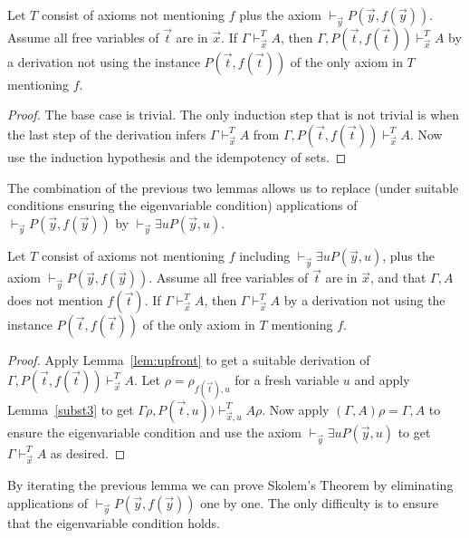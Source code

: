 \documentclass[10pt,a4paper]{article}
\begin{document}
\begin{lemma}\label{lem:upfront}
Let $T$ consist of axioms not
mentioning $f$ plus the axiom $\vdash_{\vec{y}} P(\vec{y},f(\vec{y}))$.
Assume all free variables of $\vec{t}$ are in $\vec{x}$. 
If $\Gamma\vdash_{\vec{x}}^T A$, 
then $\Gamma,P(\vec{t},f(\vec{t}))\vdash_{\vec{x}}^T A$
by a derivation not using the instance $P(\vec{t},f(\vec{t}))$
of the only axiom in $T$ mentioning $f$.
\end{lemma}

\begin{proof}
The base case is trivial.
The only induction step that is not trivial is when the last step
of the derivation infers $\Gamma\vdash_{\vec{x}}^T A$
from $\Gamma,P(\vec{t},f(\vec{t}))\vdash_{\vec{x}}^T A$.
Now use the induction hypothesis and the idempotency of sets.
\end{proof}

The combination of the previous two lemmas allows us to replace
(under suitable conditions ensuring the eigenvariable condition)
applications of $\vdash_{\vec{y}} P(\vec{y},f(\vec{y}))$
by $\vdash_{\vec{y}} \exists u P(\vec{y},u)$.

\begin{lemma}\label{lem:elimPtft}
Let $T$ consist of axioms not mentioning $f$ including 
$\vdash_{\vec{y}} \exists u P(\vec{y},u)$,  
plus the axiom $\vdash_{\vec{y}} P(\vec{y},f(\vec{y}))$.
Assume all free variables of $\vec{t}$ are in $\vec{x}$, and
that $\Gamma,A$ does not mention $f(\vec{t})$.
If $\Gamma\vdash_{\vec{x}}^T A$, 
then $\Gamma\vdash_{\vec{x}}^T A$
by a derivation not using the instance $P(\vec{t},f(\vec{t}))$
of the only axiom in $T$ mentioning $f$.
\end{lemma}

\begin{proof}
Apply Lemma~\ref{lem:upfront} to get a suitable derivation of 
$\Gamma,P(\vec{t},f(\vec{t}))\vdash_{\vec{x}}^T A$.
Let $\rho = \rho_{f(\vec{t}),u}$ for a fresh variable $u$
and apply Lemma~\ref{subst3} to get 
$\Gamma\rho,P(\vec{t},u))\vdash_{\vec{x},u}^T A\rho$.
Now apply $(\Gamma,A)\rho=\Gamma,A$ to ensure the eigenvariable
condition and use the axiom $\vdash_{\vec{y}} \exists u P(\vec{y},u)$ to get
$\Gamma\vdash_{\vec{x}}^T A$ as desired.
\end{proof}

By iterating the previous lemma we can prove Skolem's Theorem by eliminating
applications of $\vdash_{\vec{y}} P(\vec{y},f(\vec{y}))$ one by one.
The only difficulty is to ensure that the eigenvariable condition holds.
\end{document}
